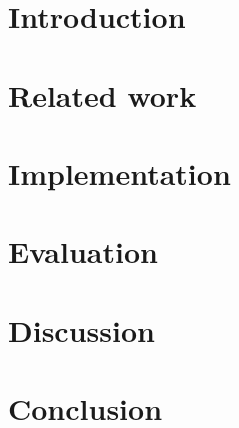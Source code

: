 \section{Introduction}
\label{section:Introduction}


\section{Related work}
\label{section:relatedWork}


\section{Implementation}
\label{section:implementation}


\section{Evaluation}
\label{section:evaluation}


\section{Discussion}
\label{section:discussion}


\section{Conclusion}
\label{section:conclusion}


